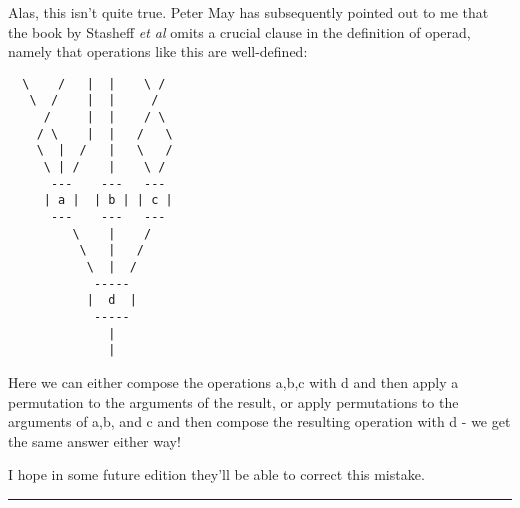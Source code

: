 Alas, this isn't quite true.  Peter May has subsequently pointed out to me 
that the book by Stasheff \emph{et al}
omits a crucial clause in the definition of operad,
namely that operations like this are well-defined:

\begin{verbatim}
  \    /   |  |    \ /  
   \  /    |  |     / 
     /     |  |    / \ 
    / \    |  |   /   \
    \  |  /   |   \   /    
     \ | /    |    \ /    
      ---    ---   ---   
     | a |  | b | | c | 
      ---    ---   --- 
         \    |    /
          \   |   /  
           \  |  / 
            ----- 
           |  d  |  
            -----  
              |   
              |  
\end{verbatim}
    
Here we can either compose the operations a,b,c with d and then
apply a permutation to the arguments of the result, or apply 
permutations to the arguments of a,b, and c and then compose
the resulting operation with d - we get the same answer either way!

I hope in some future edition they'll be able to correct this
mistake.

\par\noindent\rule{\textwidth}{0.4pt}


